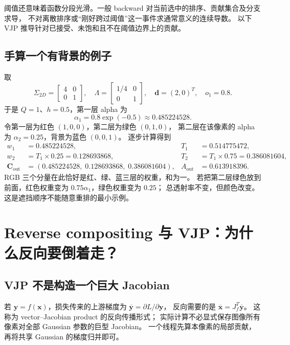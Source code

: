 阈值还意味着函数分段光滑。一般 backward 对当前选中的排序、贡献集合及分支求导，
不对离散排序或“刚好跨过阈值”这一事件求通常意义的连续导数。
以下 VJP 推导针对已接受、未饱和且不在阈值边界上的贡献。

\subsection{手算一个有背景的例子}

取
\begin{equation}
 \Sigma_{2D}=\begin{bmatrix}4&0\\0&1\end{bmatrix},\quad
 \Lambda=\begin{bmatrix}1/4&0\\0&1\end{bmatrix},\quad
 \mathbf d=(2,0)^T,\quad o_1=0.8.
\end{equation}
于是 $Q=1$、$h=0.5$，第一层 alpha 为
\begin{equation}
 \alpha_1=0.8\exp(-0.5)\approx0.485224528.
\end{equation}
令第一层为红色 $(1,0,0)$，第二层为绿色 $(0,1,0)$，
第二层在该像素的 alpha 为 $\alpha_2=0.25$，背景为蓝色 $(0,0,1)$。
逐步计算得到
\begin{align}
 w_1&=0.485224528, &T_1&=0.514775472,\\
 w_2&=T_1\times0.25=0.128693868,
 &T_2&=T_1\times0.75=0.386081604,\\
 \mathbf C_{\mathrm{out}}&=(0.485224528,\;0.128693868,\;0.386081604),
 &A_{\mathrm{out}}&=0.613918396.
\end{align}
RGB 三个分量在此恰好是红、绿、蓝三层的权重，和为一。
若把第二层绿色放到前面，红色权重变为 $0.75\alpha_1$，绿色权重变为 $0.25$；
总透射率不变，但颜色改变。这是遮挡顺序不能随意重排的最小示例。

\section{Reverse compositing 与 VJP：为什么反向要倒着走？}

\subsection{VJP 不是构造一个巨大 Jacobian}

若 $\mathbf y=f(\mathbf x)$，损失传来的上游梯度为
$\overline{\mathbf y}=\partial L/\partial\mathbf y$，
反向需要的是 $\overline{\mathbf x}=J_f^T\overline{\mathbf y}$。
这称为 vector--Jacobian product 的反向传播形式；
实际计算不必显式保存图像所有像素对全部 Gaussian 参数的巨型 Jacobian。
一个线程先算本像素的局部贡献，再将共享 Gaussian 的梯度归并即可。

